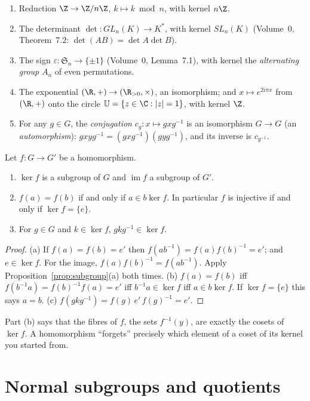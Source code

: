 \begin{example}\label{ex:homs}
\begin{enumerate}[label=(\arabic*)]
\item Reduction $\Z\to\Z/n\Z$, $k\mapsto k\bmod n$, with kernel $n\Z$.
\item The determinant $\det:GL_n(K)\to K^*$, with kernel $SL_n(K)$ (Volume~0, Theorem~7.2: $\det(AB)=\det A\det B$).
\item The sign $\varepsilon:\mathfrak S_n\to\{\pm1\}$ (Volume~0, Lemma~7.1), with kernel the \emph{alternating group} $A_n$ of even permutations.
\item The exponential $(\R,+)\to(\R_{>0},\times)$, an isomorphism; and $x\mapsto e^{2i\pi x}$ from $(\R,+)$ onto the circle $\mathbb U=\{z\in\C:|z|=1\}$, with kernel $\Z$.
\item For any $g\in G$, the \emph{conjugation} $c_g:x\mapsto gxg^{-1}$ is an isomorphism $G\to G$ (an \emph{automorphism}): $gxyg^{-1}=(gxg^{-1})(gyg^{-1})$, and its inverse is $c_{g^{-1}}$.
\end{enumerate}
\end{example}

\begin{proposition}\label{prop:kerim}
Let $f:G\to G'$ be a homomorphism.
\begin{enumerate}[label=(\alph*)]
\item $\ker f$ is a subgroup of $G$ and $\operatorname{im}f$ a subgroup of $G'$.
\item $f(a)=f(b)$ if and only if $a\in b\ker f$. In particular $f$ is injective if and only if $\ker f=\{e\}$.
\item For $g\in G$ and $k\in\ker f$, $gkg^{-1}\in\ker f$.
\end{enumerate}
\end{proposition}
\begin{proof}
(a) If $f(a)=f(b)=e'$ then $f(ab^{-1})=f(a)f(b)^{-1}=e'$; and $e\in\ker f$. For the image, $f(a)f(b)^{-1}=f(ab^{-1})$. Apply Proposition~\ref{prop:subgroup}(a) both times.
(b) $f(a)=f(b)$ iff $f(b^{-1}a)=f(b)^{-1}f(a)=e'$ iff $b^{-1}a\in\ker f$ iff $a\in b\ker f$. If $\ker f=\{e\}$ this says $a=b$.
(c) $f(gkg^{-1})=f(g)\,e'\,f(g)^{-1}=e'$.
\end{proof}

Part (b) says that the fibres of $f$, the sets $f^{-1}(y)$, are exactly the cosets of $\ker f$. A homomorphism ``forgets'' precisely which element of a coset of its kernel you started from.

\section{Normal subgroups and quotients}

